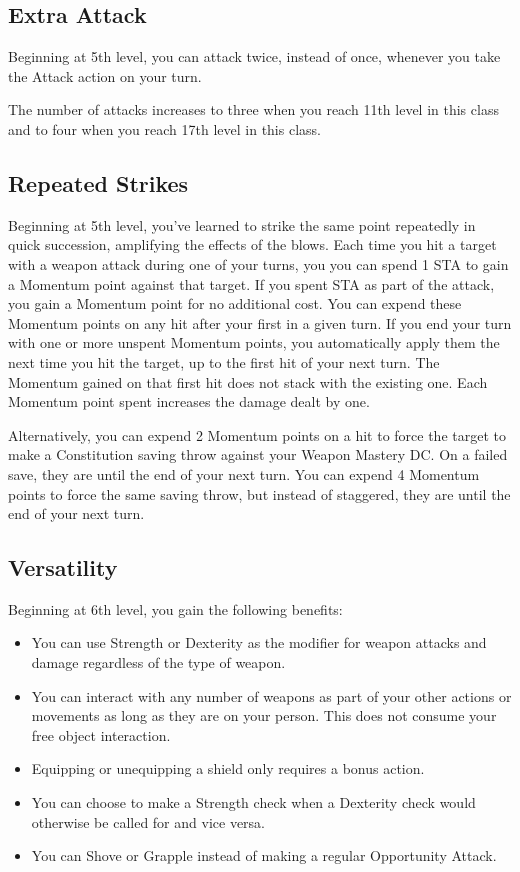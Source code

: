 \subsection{Extra Attack}

Beginning at 5th level, you can attack twice, instead of once, whenever you take the Attack action on your turn.

The number of attacks increases to three when you reach 11th level in this class and to four when you reach 17th level in this class.

\subsection{Repeated Strikes}

Beginning at 5th level, you've learned to strike the same point repeatedly in quick succession, amplifying the effects of the blows. Each time you hit a target with a weapon attack during one of your turns, you you can spend 1 STA to gain a Momentum point against that target. If you spent STA as part of the attack, you gain a Momentum point for no additional cost. You can expend these Momentum points on any hit after your first in a given turn. If you end your turn with one or more unspent Momentum points, you automatically apply them the next time you hit the target, up to the first hit of your next turn. The Momentum gained on that first hit does not stack with the existing one. Each Momentum point spent increases the damage dealt by one.

Alternatively, you can expend 2 Momentum points on a hit to force the target to make a Constitution saving throw against your Weapon Mastery DC. On a failed save, they are  until the end of your next turn. You can expend 4 Momentum points to force the same saving throw, but instead of staggered, they are  until the end of your next turn.

\subsection{Versatility}
Beginning at 6th level, you gain the following benefits:
\begin{itemize}
	\item You can use Strength or Dexterity as the modifier for weapon attacks and damage regardless of the type of weapon.
	\item You can interact with any number of weapons as part of your other actions or movements as long as they are on your person. This does not consume your free object interaction.
	\item Equipping or unequipping a shield only requires a bonus action.
	\item You can choose to make a Strength check when a Dexterity check would otherwise be called for and vice versa.
	\item You can Shove or Grapple instead of making a regular Opportunity Attack.
\end{itemize} 

